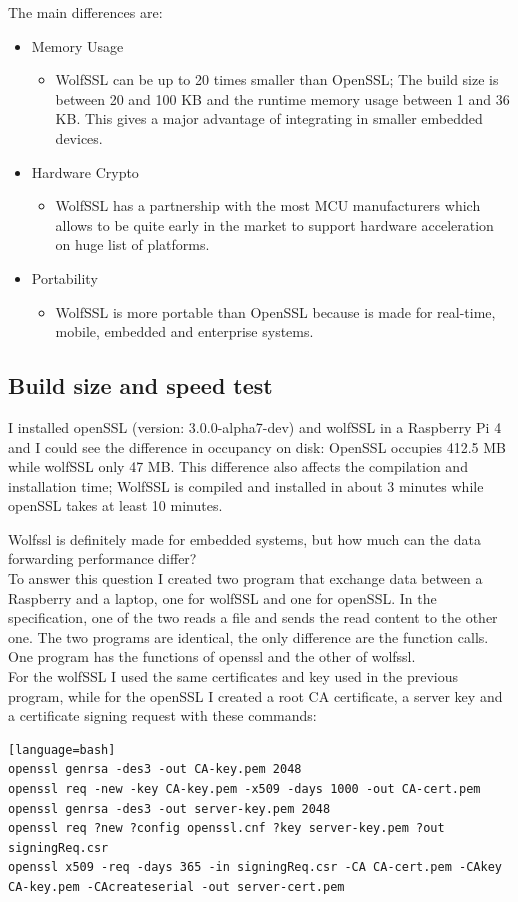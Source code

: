 \documentclass[a4paper,12pt]{article}
\begin{document}
The main differences are:
\begin{itemize}
\item Memory Usage
\begin{itemize}
\item WolfSSL can be up to 20 times smaller than OpenSSL; The build size is between 20 and 100 KB and the runtime memory usage between 1 and 36 KB. This gives a major advantage of integrating in smaller embedded devices. 
\end{itemize}
\item Hardware Crypto
\begin{itemize}
\item WolfSSL has a partnership with the most MCU manufacturers which allows to be quite early in the market to support hardware acceleration on huge list of platforms.
\end{itemize}
\item Portability
\begin{itemize}
\item WolfSSL is more portable than OpenSSL because is made for real-time, mobile, embedded and enterprise systems.
\end{itemize}
\end{itemize}

\subsection{Build size and speed test}
I installed openSSL (version: 3.0.0-alpha7-dev) and wolfSSL in a Raspberry Pi 4 and I could see the difference in occupancy on disk:
OpenSSL occupies 412.5 MB while wolfSSL only 47 MB. This difference also affects the compilation and installation time; WolfSSL is compiled and installed in about 3 minutes while openSSL takes at least 10 minutes.

Wolfssl is definitely made for embedded systems, but how much can the data forwarding performance differ?
\\To answer this question I created two program that exchange data between a Raspberry and a laptop, one for wolfSSL and one for openSSL. In the specification, one of the two reads a file and sends the read content to the other one.
The two programs are identical, the only difference are the function calls. One program has the functions of openssl and the other of wolfssl.
\\For the wolfSSL I used the same certificates and key used in the previous program, while for the openSSL I created a root CA certificate, a server key and a certificate signing request with these commands:
\begin{lstlisting}[caption={openSSL commands},captionpos=b][language=bash]
openssl genrsa -des3 -out CA-key.pem 2048
openssl req -new -key CA-key.pem -x509 -days 1000 -out CA-cert.pem
openssl genrsa -des3 -out server-key.pem 2048
openssl req ?new ?config openssl.cnf ?key server-key.pem ?out signingReq.csr
openssl x509 -req -days 365 -in signingReq.csr -CA CA-cert.pem -CAkey CA-key.pem -CAcreateserial -out server-cert.pem
\end{lstlisting}
\end{document}
